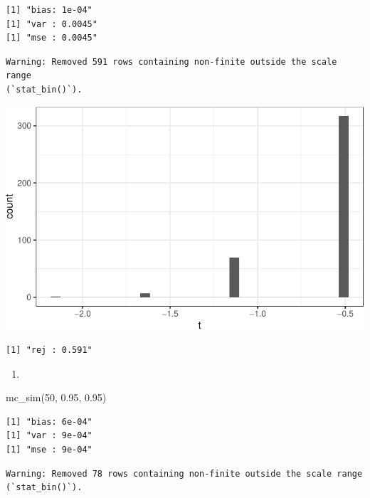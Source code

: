 \documentclass[
  letterpaper,
  DIV=11,
  numbers=noendperiod]{scrreprt}
\newenvironment{Shaded}{\begin{snugshade}}{\end{snugshade}}
\newcommand{\DecValTok}[1]{\textcolor[rgb]{0.68,0.00,0.00}{#1}}
\newcommand{\FloatTok}[1]{\textcolor[rgb]{0.68,0.00,0.00}{#1}}
\newcommand{\FunctionTok}[1]{\textcolor[rgb]{0.28,0.35,0.67}{#1}}
\newcommand{\NormalTok}[1]{\textcolor[rgb]{0.00,0.23,0.31}{#1}}
\providecommand{\tightlist}{%
  \setlength{\itemsep}{0pt}\setlength{\parskip}{0pt}}\usepackage{longtable,booktabs,array}
\begin{document}
\begin{verbatim}
[1] "bias: 1e-04"
[1] "var : 0.0045"
[1] "mse : 0.0045"
\end{verbatim}

\begin{verbatim}
Warning: Removed 591 rows containing non-finite outside the scale range
(`stat_bin()`).
\end{verbatim}

\includegraphics{07-inference_files/figure-pdf/unnamed-chunk-15-1.pdf}

\begin{verbatim}
[1] "rej : 0.591"
\end{verbatim}

\begin{enumerate}
\def\labelenumi{\arabic{enumi}.}
\setcounter{enumi}{8}
\tightlist
\item
\end{enumerate}

\begin{Shaded}
\begin{Highlighting}[]
\FunctionTok{mc\_sim}\NormalTok{(}\DecValTok{50}\NormalTok{, }\FloatTok{0.95}\NormalTok{, }\FloatTok{0.95}\NormalTok{)}
\end{Highlighting}
\end{Shaded}

\begin{verbatim}
[1] "bias: 6e-04"
[1] "var : 9e-04"
[1] "mse : 9e-04"
\end{verbatim}

\begin{verbatim}
Warning: Removed 78 rows containing non-finite outside the scale range
(`stat_bin()`).
\end{verbatim}
\end{document}
